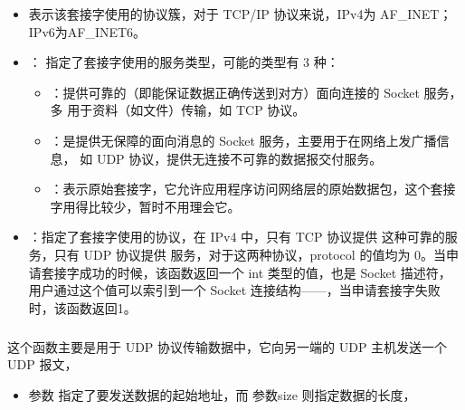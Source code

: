 \documentclass[a4paper,12pt,english]{sphinxmanual}
\begin{document}
{{\begin{sphinxVerbatim}[commandchars=\\\{\}]
\end{sphinxVerbatim}

\sphinxAtStartPar
{}
\begin{itemize}
\item {} 
\sphinxAtStartPar
{} 表示该套接字使用的协议簇，对于 TCP/IP 协议来说，IPv4为 AF\_INET；IPv6为AF\_INET6。

\item {} 
\sphinxAtStartPar
{}： 指定了套接字使用的服务类型，可能的类型有 3 种：
\begin{itemize}
\item {} 
\sphinxAtStartPar
{}：提供可靠的（即能保证数据正确传送到对方）面向连接的 Socket 服务，多
用于资料（如文件）传输，如 TCP 协议。

\item {} 
\sphinxAtStartPar
{}：是提供无保障的面向消息的 Socket 服务，主要用于在网络上发广播信息，
如 UDP 协议，提供无连接不可靠的数据报交付服务。

\item {} 
\sphinxAtStartPar
{}：表示原始套接字，它允许应用程序访问网络层的原始数据包，这个套接字用得比较少，暂时不用理会它。

\end{itemize}

\item {} 
\sphinxAtStartPar
{} ：指定了套接字使用的协议，在 IPv4 中，只有 TCP 协议提供  这种可靠的服务，只有 UDP 协议提供  服务，对于这两种协议，protocol 的值均为 0。当申请套接字成功的时候，该函数返回一个 int 类型的值，也是 Socket 描述符，用户通过这个值可以索引到一个 Socket 连接结构——，当申请套接字失败时，该函数返回\sphinxhyphen{}1。

\end{itemize}


\subparagraph{}
\label{\detokenize{exp-esp32/socket/tcp:sendto}}
\sphinxAtStartPar
这个函数主要是用于 UDP 协议传输数据中，它向另一端的 UDP 主机发送一个 UDP 报文，
\begin{itemize}
\item {} 
\sphinxAtStartPar
参数  指定了要发送数据的起始地址，而 参数size 则指定数据的长度，


\end{itemize}}}
\end{document}
